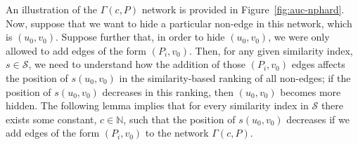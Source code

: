 \documentclass[twocolumn]{article}
\newcommand{\N}{\mathbb{N}}
\begin{document}
\noindent An illustration of the $\Gamma(c,P)$ network is provided in Figure~\ref{fig:auc-nphard}. Now, suppose that we want to hide a particular non-edge in this network, which is $(u_0,v_0)$. Suppose further that, in order to hide $(u_0,v_0)$, we were only allowed to add edges of the form $(P_i,v_0)$. Then, for any given similarity index, $s\in\mathcal{S}$, we need to understand how the addition of those $(P_i,v_0)$ edges affects the position of $s(u_0,v_0)$ in the similarity-based ranking of all non-edges; if the position of $s(u_0,v_0)$ decreases in this ranking, then $(u_0,v_0)$ becomes more hidden. The following lemma implies that for every similarity index in $\mathcal{S}$ there exists some constant, $c \in \N$, such that the position of $s(u_0,v_0)$ decreases if we add edges of the form $(P_i,v_0)$ to the network $\Gamma(c,P)$. 
\end{document}
